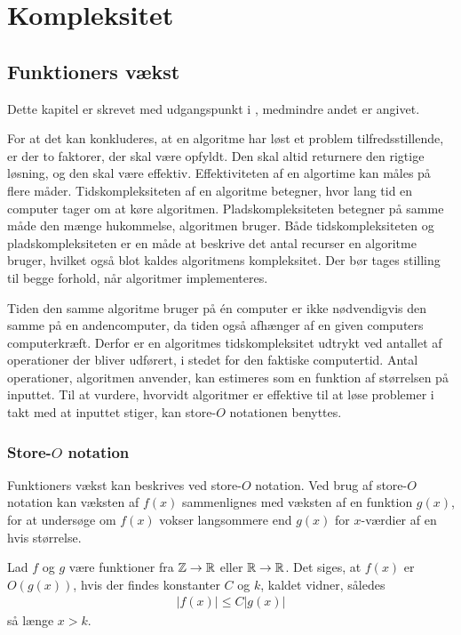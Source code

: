 \chapter{Kompleksitet}
\section{Funktioners vækst}
Dette kapitel er skrevet med udgangspunkt i \citep{dmat}, medmindre andet er angivet. 

For at det kan konkluderes, at en algoritme har løst et problem tilfredsstillende, er der to faktorer, der skal være opfyldt. Den skal altid returnere den rigtige løsning, og den skal være effektiv. 
Effektiviteten af en algortime kan måles på flere måder.
Tidskompleksiteten af en algoritme betegner, hvor lang tid en computer tager om at køre algoritmen.
Pladskompleksiteten betegner på samme måde den mænge hukommelse, algoritmen bruger.
Både tidskompleksiteten og pladskompleksiteten er en måde at beskrive det antal recurser en algoritme bruger, hvilket også blot kaldes algoritmens kompleksitet.
Der bør tages stilling til begge forhold, når algoritmer implementeres.

Tiden den samme algoritme bruger på én computer er ikke nødvendigvis den samme på en andencomputer, da tiden også afhænger af en given computers computerkræft.
Derfor er en algoritmes tidskompleksitet udtrykt ved antallet af operationer der bliver udførert, i stedet for den faktiske computertid.
Antal operationer, algoritmen anvender, kan estimeres som en funktion af størrelsen på inputtet. 
Til at vurdere, hvorvidt algoritmer er effektive til at løse problemer i takt med at inputtet stiger, kan store-$O$ notationen benyttes.

\subsection{Store-$O$ notation}
Funktioners vækst kan beskrives ved store-$O$ notation.
Ved brug af store-$O$ notation kan væksten af $f(x)$ sammenlignes med væksten af en funktion $g(x)$, for at undersøge om $f(x)$ vokser langsommere end $g(x)$ for $x$-værdier af en hvis størrelse.

\begin{defn}\label{eq_o}
	Lad $f$ og $g$ være funktioner fra $\mathbb{Z} \to \mathbb{R}$ eller $\mathbb{R} \to \mathbb{R}$.
	Det siges, at $f(x)$ er $O(g(x))$, hvis der findes konstanter $C$ og $k$, kaldet vidner, således 
	\begin{align*}
		|f(x)| \leq C |g(x)|
	\end{align*}
	så længe $x>k$.
\end{defn}

